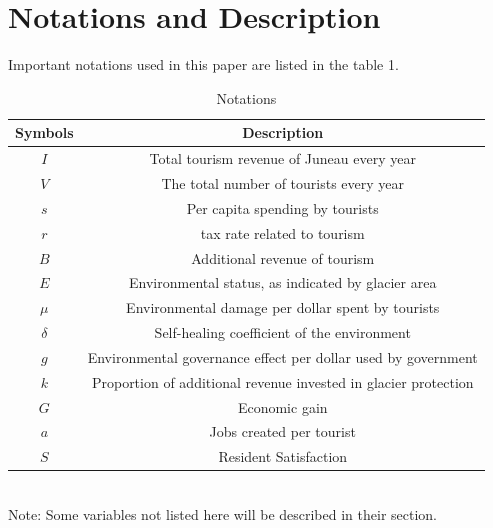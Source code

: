 \documentclass[UTF8]{mcmthesis}
\begin{document}
    \section{Notations and Description}
        Important notations used in this paper are listed in the table 1.
        \vspace{-.5em}
        \begin{table}[htbp]
            \centering
            \caption{Notations}
            \vspace{0.5em}
            \begin{tabular}{cc}
                \toprule                %
                    \textbf{Symbols} & \textbf{Description} \\ 
                \midrule                %
                $I$        & Total tourism revenue of Juneau every year \\ 
                $V$        & The total number of tourists every year \\ 
                $s$        & Per capita spending by tourists \\ 
                $r$        & tax rate related to tourism \\  
                $B$        & Additional revenue of tourism \\ 
                $E$        & Environmental status, as indicated by glacier area \\ 
                $\mu$      & Environmental damage per dollar spent by tourists \\ 
                $\delta$   & Self-healing coefficient of the environment  \\ 
                $g$        & Environmental governance effect per dollar used by government \\ 
                $k$        & Proportion of additional revenue invested in glacier protection \\ 
                $G$        & Economic gain \\ 
                $a$        & Jobs created per tourist \\ 
                $S$        & Resident Satisfaction \\  
                \bottomrule             %
            \end{tabular}

        \end{table} \\
       Note: Some variables not listed here will be described in their section.
\end{document}
